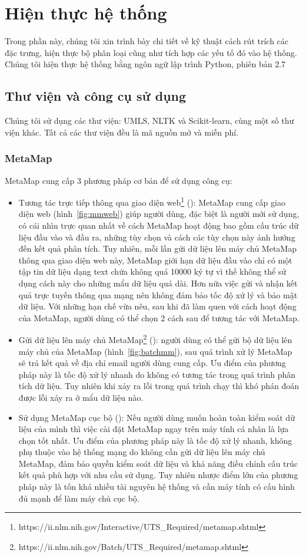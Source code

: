 \section{Hiện thực hệ thống} \label{sec:hienthuchethong}
Trong phần này, chúng tôi xin trình bày chi tiết về kỹ thuật cách rút trích các đặc trưng, hiện thực bộ phân loại cũng như tích hợp các yếu tố đó vào hệ thống. 
Chúng tôi hiện thực hệ thống bằng ngôn ngữ lập trình Python, phiên bản 2.7

\subsection{Thư viện và công cụ sử dụng}
Chúng tôi sử dụng các thư viện: UMLS, NLTK và Scikit-learn, cùng một số thư viện khác. Tất cả các thư viện đều là mã nguồn mở và miễn phí.
\subsubsection*{MetaMap}
MetaMap cung cấp 3 phương pháp cơ bản để sử dụng công cụ:
\begin{itemize}
\item Tương tác trực tiếp thông qua giao diện web\footnote{https://ii.nlm.nih.gov/Interactive/UTS\_Required/metamap.shtml} (): MetaMap cung cấp giao diện web (hình~\ref{fig:mmweb}) giúp người dùng, đặc biệt là người mới sử dụng, có cái nhìn trực quan nhất về cách MetaMap hoạt động bao gồm cấu trúc dữ liệu đầu vào và đầu ra, những tùy chọn và cách các tùy chọn này ảnh hưởng đến kết quả phân tích. Tuy nhiên, mỗi lần gửi dữ liệu lên máy chủ MetaMap thông qua giao diện web này, MetaMap giới hạn dữ liệu đầu vào chỉ có một tập tin dữ liệu dạng text chứa không quá 10000 ký tự vì thế không thể sử dụng cách này cho những mẩu dữ liệu quá dài. Hơn nữa việc gửi và nhận kết quả trực tuyến thông qua mạng nên không đảm bảo tốc độ xử lý và bảo mật dữ liệu. Với những hạn chế vừa nêu, sau khi đã làm quen với cách hoạt động của MetaMap, người dùng có thể chọn 2 cách sau để tương tác với MetaMap.
\item Gửi dữ liệu lên máy chủ MetaMap\footnote{https://ii.nlm.nih.gov/Batch/UTS\_Required/metamap.shtml} (): người dùng có thể gửi bộ dữ liệu lên máy chủ của MetaMap (hình~\ref{fig:batchmm}), sau quá trình xử lý MetaMap sẽ trả kết quả về địa chỉ email người dùng cung cấp. Ưu điểm của phương pháp này là tốc độ xử lý nhanh do không có tương tác trong quá trình phân tích dữ liệu. Tuy nhiên khi xảy ra lỗi trong quá trình chạy thì khó phán đoán được lỗi xảy ra ở mẩu dữ liệu nào. 
\item Sử dụng MetaMap cục bộ (): Nếu người dùng muốn hoàn toàn kiểm soát dữ liệu của mình thì việc cài đặt MetaMap ngay trên máy tính cá nhân là lựa chọn tốt nhất. Ưu điểm của phương pháp này là tốc độ xử lý nhanh, không phụ thuộc vào hệ thống mạng do không cần gửi dữ liệu lên máy chủ MetaMap, đảm bảo quyền kiểm soát dữ liệu và khả năng điều chỉnh cấu trúc kết quả phù hợp với nhu cầu sử dụng. Tuy nhiên nhược điểm lớn của phương pháp này là tốn khá nhiều tài nguyên hệ thống và cần máy tính có cấu hình đủ mạnh để làm máy chủ cục bộ.
\end{itemize}

